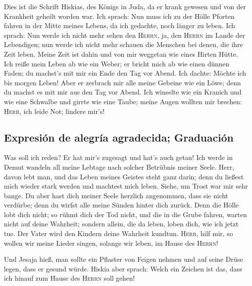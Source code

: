  Dies ist die Schrift Hiskias, des Königs in Juda, da er
krank gewesen und von der Krankheit geheilt worden war. 
Ich sprach: Nun muss ich zu der Hölle Pforten fahren in der Mitte meines
Lebens, da ich gedachte, noch länger zu leben.  Ich
sprach: Nun werde ich nicht mehr sehen den \textsc{Herrn}, ja, den
\textsc{Herrn} im Lande der Lebendigen; nun werde ich nicht mehr schauen
die Menschen bei denen, die ihre Zeit leben.  Meine Zeit
ist dahin und von mir weggetan wie eines Hirten Hütte. Ich reiße mein
Leben ab wie ein Weber; er bricht mich ab wie einen dünnen Faden; du
machst's mit mir ein Ende den Tag vor Abend.  Ich dachte:
Möchte ich bis morgen Leben! Aber er zerbrach mir alle meine Gebeine wie
ein Löwe; denn du machst es mit mir aus den Tag vor Abend.
 Ich winselte wie ein Kranich und wie eine Schwalbe und
girrte wie eine Taube; meine Augen wollten mir brechen: \textsc{Herr},
ich leide Not; lindere mir's!

\hypertarget{expresiuxf3n-de-alegruxeda-agradecida-graduaciuxf3n}{%
\subsection{Expresión de alegría agradecida;
Graduación}\label{expresiuxf3n-de-alegruxeda-agradecida-graduaciuxf3n}}

 Was soll ich reden? Er hat mir's zugesagt und hat's auch
getan! Ich werde in Demut wandeln all meine Lebtage nach solcher
Betrübnis meiner Seele.  Herr, davon lebt man, und das
Leben meines Geistes steht ganz darin; denn du ließest mich wieder stark
werden und machtest mich leben.  Siehe, um Trost war mir
sehr bange. Du aber hast dich meiner Seele herzlich angenommen, dass sie
nicht verdürbe; denn du wirfst alle meine Sünden hinter dich zurück.
 Denn die Hölle lobt dich nicht; so rühmt dich der Tod
nicht, und die in die Grube fahren, warten nicht auf deine Wahrheit;
 sondern allein, die da leben, loben dich, wie ich jetzt
tue. Der Vater wird den Kindern deine Wahrheit kundtun. 
\textsc{Herr}, hilf mir, so wollen wir meine Lieder singen, solange wir
leben, im Hause des \textsc{Herrn}!

 Und Jesaja hieß, man sollte ein Pflaster von Feigen
nehmen und auf seine Drüse legen, dass er gesund würde. 
Hiskia aber sprach: Welch ein Zeichen ist das, dass ich hinauf zum Hause
des \textsc{Herrn} soll gehen!

